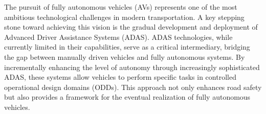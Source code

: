 \documentclass[a4paper,oneside,10pt,ngerman,english]{scrartcl}
\begin{document}


The pursuit of fully autonomous vehicles (AVs) represents one of the most ambitious technological challenges in modern transportation. A key stepping stone toward achieving this vision is the gradual development and deployment of Advanced Driver Assistance Systems (ADAS). ADAS technologies, while currently limited in their capabilities, serve as a critical intermediary, bridging the gap between manually driven vehicles and fully autonomous systems. By incrementally enhancing the level of autonomy through increasingly sophisticated ADAS, these systems allow vehicles to perform specific tasks in controlled operational design domains (ODDs). This approach not only enhances road safety but also provides a framework for the eventual realization of fully autonomous vehicles.
\end{document}
